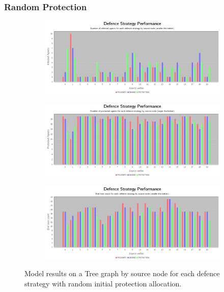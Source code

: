 \documentclass[results.tex]{subfiles}
\begin{document}
\newpage 


\subsubsection{Random Protection}



\newpage

\begin{figure}[!ht]
\centering
     \begin{subfigure}[b]{0.9\textwidth}
         \centering
         \includegraphics[width=\textwidth]{Tree/Random/RandomInfectedChart}
         \label{fig:tree-ran-infected}
     \end{subfigure}
     \vfill
     \begin{subfigure}[b]{0.9\textwidth}
         \centering
         \includegraphics[width=\textwidth]{Tree/Random/RandomProtectedChart}
         \label{fig:tree-ran-protected}
     \end{subfigure}
     \vfill
     \begin{subfigure}[b]{0.9\textwidth}
         \centering
         \includegraphics[width=\textwidth]{Tree/Random/RandomEndTurnChart}
         \label{fig:tree-ran-end}
     \end{subfigure}
        \caption{Model results on a Tree graph by source node for each defence strategy with random initial protection allocation.}
        \label{fig:tree-ran-charts}
\end{figure}
\end{document}
